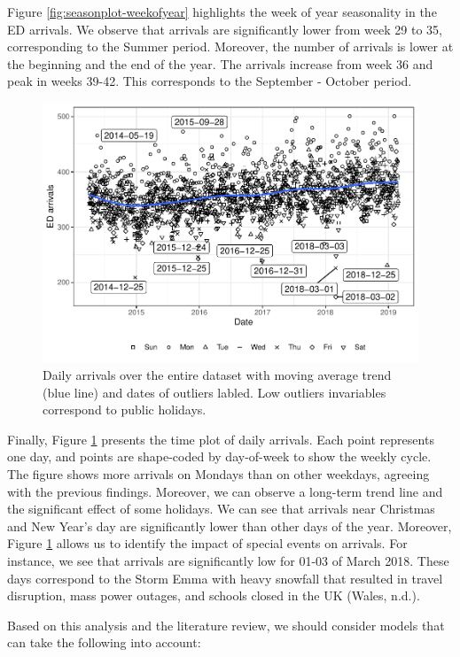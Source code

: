 \documentclass[]{elsarticle} %
\begin{document}
Figure \ref{fig:seasonplot-weekofyear} highlights the week of year
seasonality in the ED arrivals. We observe that arrivals are
significantly lower from week 29 to 35, corresponding to the Summer
period. Moreover, the number of arrivals is lower at the beginning and
the end of the year. The arrivals increase from week 36 and peak in
weeks 39-42. This corresponds to the September - October period.

\begin{figure}[H]

{\centering \includegraphics[width=0.7\linewidth]{paper_files/figure-latex/date-plot-1} 

}

\caption{Daily arrivals over the entire dataset with moving average trend (blue line) and dates of outliers labled. Low outliers invariables correspond to public holidays.}\label{fig:date-plot}
\end{figure}

Finally, Figure \ref{fig:date-plot} presents the time plot of daily
arrivals. Each point represents one day, and points are shape-coded by
day-of-week to show the weekly cycle. The figure shows more arrivals on
Mondays than on other weekdays, agreeing with the previous findings.
Moreover, we can observe a long-term trend line and the significant
effect of some holidays. We can see that arrivals near Christmas and New
Year's day are significantly lower than other days of the year.
Moreover, Figure \ref{fig:date-plot} allows us to identify the impact
of special events on arrivals. For instance, we see that arrivals are
significantly low for 01-03 of March 2018. These days correspond to the
Storm Emma with heavy snowfall that resulted in travel disruption, mass
power outages, and schools closed in the UK (Wales, n.d.).

Based on this analysis and the literature review, we should consider
models that can take the following into account:
\end{document}
